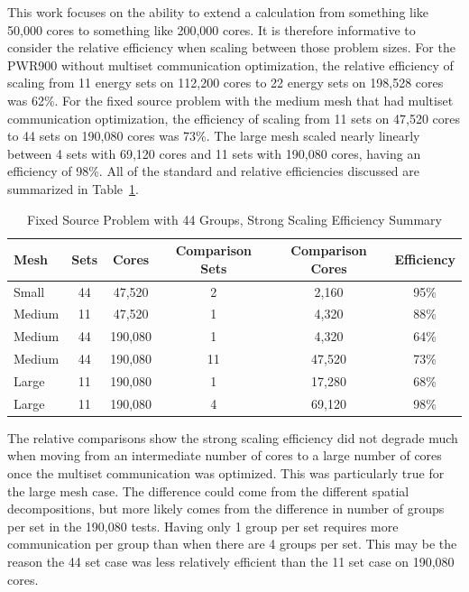 This work focuses on the ability to extend a calculation from something like 50,000 cores to something like 200,000 cores. It is therefore informative to consider the relative efficiency when scaling between those problem sizes. For the PWR900 without multiset communication optimization, the relative efficiency of scaling from 11 energy sets on 112,200 cores to 22 energy sets on 198,528 cores was 62\%. For the fixed source problem with the medium mesh that had multiset communication optimization, the efficiency of scaling from 11 sets on 47,520 cores to 44 sets on 190,080 cores was 73\%. The large mesh scaled nearly linearly between 4 sets with 69,120 cores and 11 sets with 190,080 cores, having an efficiency of 98\%. All of the standard and relative efficiencies discussed are summarized in Table~\ref{table:44FxdSrcEff}.
%
\begin{table}[!h]
\caption{Fixed Source Problem with 44 Groups, Strong Scaling Efficiency Summary}
\begin{center}
\begin{tabular}{| l | c | c | c | c | c |}
\hline
Mesh & Sets & Cores & Comparison Sets & Comparison Cores & Efficiency \\[0.5ex]
\hline
Small     & 44 & 47,520   & 2 & 2,160     & 95\% \\
Medium & 11 & 47,520   & 1 & 4,320     & 88\% \\
Medium & 44 & 190,080 & 1 & 4,320     & 64\% \\
Medium & 44 & 190,080 & 11 & 47,520 & 73\% \\
Large    & 11 & 190,080 & 1 & 17,280   & 68\% \\
Large    & 11 & 190,080 & 4 & 69,120   & 98\% \\
\hline
\end{tabular}
\end{center}
\label{table:44FxdSrcEff}
\end{table}

The relative comparisons show the strong scaling efficiency did not degrade much when moving from an intermediate number of cores to a large number of cores once the multiset communication was optimized. This was particularly true for the large mesh case. The difference could come from the different spatial decompositions, but more likely comes from the difference in number of groups per set in the 190,080 tests. Having only 1 group per set requires more communication per group than when there are 4 groups per set. This may be the reason the 44 set case was less relatively efficient than the 11 set case on 190,080 cores.

